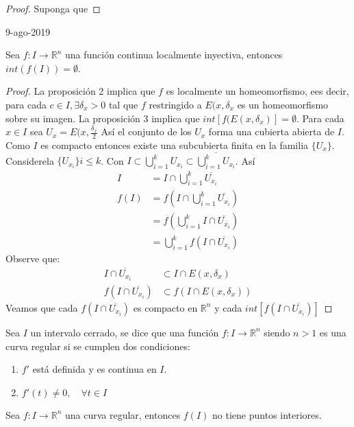 \begin{proof}
  Suponga que 
\end{proof}
9-ago-2019
\begin{proposition}
  Sea $f: I \to \mathbb{R}^n$ una función continua localmente inyectiva,
  entonces $int(f(I)) = \emptyset$. 
\end{proposition}
\begin{proof}
  La proposición 2 implica que $f$ es localmente un homeomorfismo, ees decir,
  para cada $c \in I, \exists \delta_x > 0$ tal que $f$ restringido a  $E(x,
  \delta_x$ es un homeomorfismo sobre su imagen. La proposición 3 implica que
  $int[f(E(x,\delta_x)] = \emptyset$. Para cada $x \in I$ sea $U_x = E (x,
  \frac{\delta_x}{2}$  Así el conjunto de los $U_x$ forma una cubierta abierta de
  $I$. Como $I$ es compacto entonces existe una subcubierta finita en la familia
  $\{U_x\}$. Considerela $\{U_{x_i}\} i \leq k$. Con  $I \subset \bigcup_{i=1}^k
  U_{x_i} \subset \overline{\bigcup_{i=1}^k U_{x_i}}$.
  Así 
  \begin{align*}
    I &= I \cap \bigcup_{i=1}^k \overline{U_{x_i}} \\
    f(I) &= f(I \cap \bigcup_{i=1}^k \overline{U_{x_i}}) \\
         &=f( \bigcup_{i=1}^k I \cap \overline{U_{x_i}}) \\
         &=\bigcup_{i=1}^kf(  I \cap \overline{U_{x_i}})
  \end{align*}
  Observe que: 
  \begin{align*}
    I \cap \overline{U_{x_i}} &\subset I\cap E(x,\delta_x) \\
    f(I \cap \overline{U_{x_i}}) &\subset f(I\cap E(x,\delta_x))
  \end{align*}
  Veamos que cada $f(I \cap \overline{U_{x_i}})$ es compacto en $\mathbb{R}^n$ y cada
  $int[f(I \cap \overline{U_{x_i}})]$
\end{proof}
\begin{definition}
  Sea $I$ un intervalo cerrado, se dice que una función $f: I \to \mathbb{R}^n$
  siendo $n >1$ es una curva regular si se cumplen dos condiciones:
  \begin{enumerate}
    \item $f'$ está definida y es continua en $I$.
    \item $f'(t) \neq 0, \quad \forall t \in I$  
  \end{enumerate}
\end{definition}
\begin{proposition}
  Sea $f:I \to \mathbb{R}^n$ una curva regular, entonces $f(I)$ no tiene puntos
  interiores.
\end{proposition}
